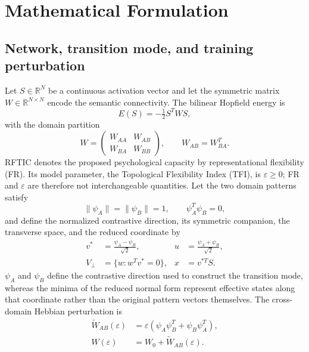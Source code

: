 \documentclass[a4paper,twocolumn,10pt]{article}
\newcommand{\eps}{\varepsilon}
\newcommand{\psiA}{\psi_A}
\newcommand{\psiB}{\psi_B}
\newcommand{\WAB}{\tilde{W}_{AB}}
\begin{document}
\section{Mathematical Formulation}
\label{sec:math}

\subsection{Network, transition mode, and training perturbation}

Let $S\in\mathbb{R}^N$ be a continuous activation vector and let the symmetric matrix
$W\in\mathbb{R}^{N\times N}$ encode the semantic connectivity. The bilinear Hopfield energy is
\begin{equation}
E(S)=-\tfrac12 S^TWS,
\label{eq:energy}
\end{equation}
with the domain partition
\begin{equation}
W=\begin{pmatrix}W_{AA}&W_{AB}\\W_{BA}&W_{BB}\end{pmatrix},
\qquad W_{AB}=W_{BA}^T.
\label{eq:blocks}
\end{equation}
RFTIC denotes the proposed psychological capacity by representational flexibility (FR). Its model
parameter, the Topological Flexibility Index (TFI), is $\eps\geq0$; FR and $\eps$ are therefore not
interchangeable quantities. Let the two domain patterns satisfy
\begin{equation}
\|\psiA\|=\|\psiB\|=1,\qquad \psiA^T\psiB=0,
\label{eq:orthonormal}
\end{equation}
and define the normalized contrastive direction, its symmetric companion, the transverse space,
and the reduced coordinate by
\begin{equation}
\begin{aligned}
v^*&=\frac{\psiA-\psiB}{\sqrt2},&
u&=\frac{\psiA+\psiB}{\sqrt2},\\
V_\perp&=\{w:w^Tv^*=0\},& x&=v^{*T}S.
\end{aligned}
\label{eq:projection}
\end{equation}
$\psiA$ and $\psiB$ define the contrastive direction used to construct the transition mode, whereas
the minima of the reduced normal form represent effective states along that coordinate rather than
the original pattern vectors themselves.
The cross-domain Hebbian perturbation is
\begin{equation}
\begin{aligned}
\WAB(\eps)&=\eps(\psiA\psiB^T+\psiB\psiA^T),\\
W(\eps)&=W_0+\WAB(\eps).
\end{aligned}
\label{eq:hebbian}
\end{equation}
\end{document}
